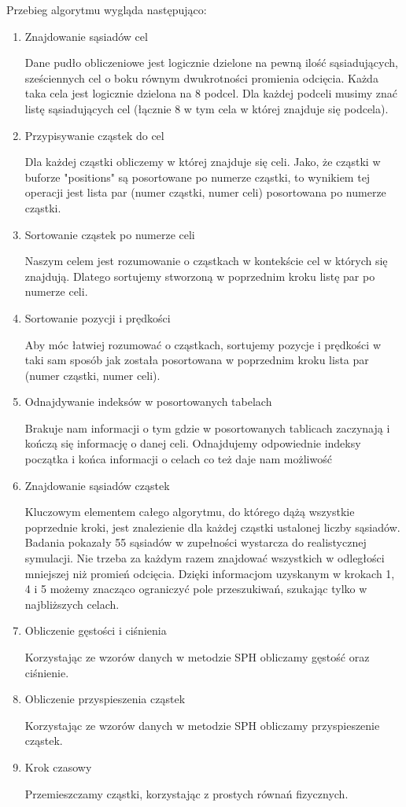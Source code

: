 \documentclass[polish, 12pt]{aghthesis}
\begin{document}
		\noindent Przebieg algorytmu wygląda następująco:
			\begin{enumerate}
			\item{Znajdowanie sąsiadów cel}
			
				Dane pudło obliczeniowe jest logicznie dzielone na pewną ilość sąsiadujących, sześciennych cel o boku równym dwukrotności promienia odcięcia. Każda taka cela jest logicznie dzielona na 8 podcel. Dla każdej podceli musimy znać listę sąsiadujących cel (łącznie 8 w tym cela w której znajduje się podcela).
			\item{Przypisywanie cząstek do cel}
			
				Dla każdej cząstki obliczemy w której znajduje się celi. Jako, że cząstki w buforze "positions" są posortowane po numerze cząstki, to wynikiem tej operacji jest lista par (numer cząstki, numer celi) posortowana po numerze cząstki.
			\item{Sortowanie cząstek po numerze celi}
			
				Naszym celem jest rozumowanie o cząstkach w kontekście cel w których się znajdują. Dlatego sortujemy stworzoną w poprzednim kroku listę par po numerze celi.
			\item{Sortowanie pozycji i prędkości}
			
				Aby móc łatwiej rozumować o cząstkach, sortujemy pozycje i prędkości w taki sam sposób jak została posortowana w poprzednim kroku lista par (numer cząstki, numer celi).
			\item{Odnajdywanie indeksów w posortowanych tabelach}
			
				Brakuje nam informacji o tym gdzie w posortowanych tablicach zaczynają i kończą się informację o danej celi. Odnajdujemy odpowiednie indeksy początka i końca informacji o celach co też daje nam możliwość
				
			\item{Znajdowanie sąsiadów cząstek}
			
				Kluczowym elementem całego algorytmu, do którego dążą wszystkie poprzednie kroki, jest znalezienie dla każdej cząstki ustalonej liczby sąsiadów. Badania pokazały 55 sąsiadów w zupełności wystarcza do realistycznej symulacji. Nie trzeba za każdym razem znajdować wszystkich w odległości mniejszej niż promień odcięcia. Dzięki informacjom uzyskanym w krokach 1, 4 i 5 możemy znacząco ograniczyć pole przeszukiwań, szukając tylko w najbliższych celach.
			\item{Obliczenie gęstości i ciśnienia}
			
				Korzystając ze wzorów danych w metodzie SPH obliczamy gęstość oraz ciśnienie.
			\item{Obliczenie przyspieszenia cząstek}
			
				Korzystając ze wzorów danych w metodzie SPH obliczamy przyspieszenie cząstek.
			\item{Krok czasowy}
			
				Przemieszczamy cząstki, korzystając z prostych równań fizycznych.
				
			\end{enumerate}
			
\end{document}
